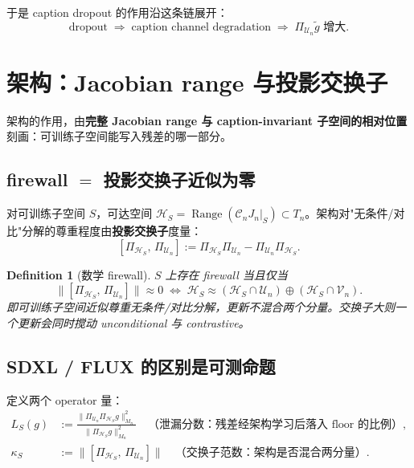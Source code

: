 \documentclass[11pt,a4paper]{article}
\newtheorem{definition}[theorem]{Definition}
\newcommand{\cH}{\mathcal{H}}
\newcommand{\cU}{\mathcal{U}}
\newcommand{\cV}{\mathcal{V}}
\newcommand{\ProjectOp}{\Pi}
\newcommand{\Range}{\operatorname{Range}}
\newcommand{\Center}{\mathcal{C}}
\begin{document}
\noindent 于是 caption dropout 的作用沿这条链展开：
\[
\text{dropout} \;\Rightarrow\; \text{caption channel degradation} \;\Rightarrow\; \ProjectOp_{\cU_n}\tilde g \text{ 增大}.
\]

\section{架构：Jacobian range 与投影交换子}
\label{sec:arch_commutator}

架构的作用，由\textbf{完整 Jacobian range 与 caption-invariant 子空间的相对位置}刻画：可训练子空间能写入残差的哪一部分。

\subsection{firewall $=$ 投影交换子近似为零}

对可训练子空间 $S$，可达空间 $\cH_S=\Range(\Center_n J_n|_S)\subset T_n$。架构对"无条件/对比"分解的尊重程度由\textbf{投影交换子}度量：
\begin{equation}\label{eq:commutator}
[\ProjectOp_{\cH_S},\,\ProjectOp_{\cU_n}] := \ProjectOp_{\cH_S}\ProjectOp_{\cU_n} - \ProjectOp_{\cU_n}\ProjectOp_{\cH_S}.
\end{equation}

\begin{definition}[数学 firewall]
$S$ 上存在 firewall 当且仅当
\begin{equation}\label{eq:firewall_math}
\boxed{
\bigl\|[\ProjectOp_{\cH_S},\,\ProjectOp_{\cU_n}]\bigr\|\approx 0
\;\Longleftrightarrow\;
\cH_S \approx (\cH_S\cap\cU_n)\oplus(\cH_S\cap\cV_n).
}
\end{equation}
即可训练子空间近似尊重无条件/对比分解，更新不混合两个分量。交换子大则一个更新会同时搅动 unconditional 与 contrastive。
\end{definition}

\subsection{SDXL / FLUX 的区别是可测命题}

定义两个 operator 量：
\begin{align}
L_S(g) &:= \frac{\|\ProjectOp_{\cU_n}\ProjectOp_{\cH_S}g\|_{M_n}^2}{\|\ProjectOp_{\cH_S}g\|_{M_n}^2} \quad\text{（泄漏分数：残差经架构学习后落入 floor 的比例）}, \label{eq:leak_op}\\
\kappa_S &:= \bigl\|[\ProjectOp_{\cH_S},\,\ProjectOp_{\cU_n}]\bigr\| \quad\text{（交换子范数：架构是否混合两分量）}. \label{eq:commnorm}
\end{align}
\end{document}
